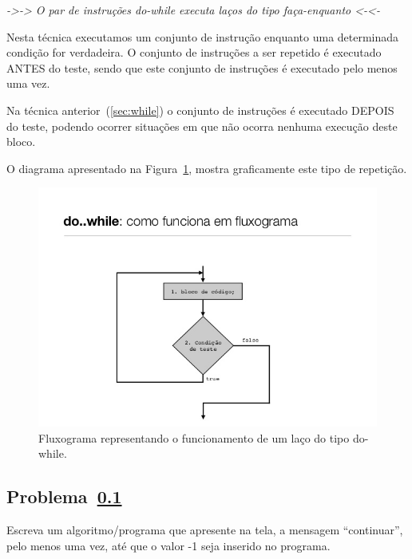 \begin{center}
  \emph{->-> O par de instruções do-while executa laços do tipo faça-enquanto <-<-}  
\end{center}

Nesta técnica executamos um conjunto de instrução enquanto uma determinada condição for verdadeira. O conjunto de instruções a ser repetido é executado ANTES do teste, sendo que este conjunto de instruções é executado pelo menos uma vez. 

Na técnica anterior~(\ref{sec:while}) o conjunto de instruções é executado DEPOIS do teste, podendo ocorrer situações em que não ocorra nenhuma execução deste bloco.

O diagrama apresentado na Figura~\ref{fig:laco-do-while}, mostra graficamente este tipo de repetição.

\begin{figure}[h]
  \begin{center}
    \includegraphics[width=0.75\linewidth]{img/laco-do-while.png}
    \caption{Fluxograma representando o funcionamento de um laço do tipo do-while.}
    \label{fig:laco-do-while}
  \end{center}
\end{figure}

\subsection{Problema~\ref{sec:problema(do-while1)}}
\label{sec:problema(do-while1)}

Escreva um algoritmo/programa que apresente na tela, a mensagem “continuar”, pelo menos uma vez, até que o valor -1 seja inserido no programa.

